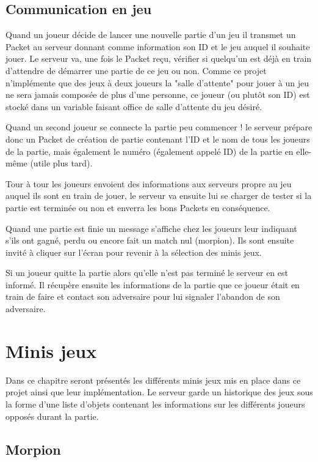 \documentclass{report}
\begin{document}
\section{Communication en jeu}

Quand un joueur décide de lancer une nouvelle partie d'un jeu il transmet un Packet au serveur donnant comme information son ID et le jeu
auquel il souhaite jouer. Le serveur va, une fois le Packet reçu, vérifier si quelqu'un est déjà en train d'attendre de démarrer une partie de ce jeu
ou non. Comme ce projet n'implémente que des jeux à deux joueurs la "salle d'attente" pour jouer à un jeu ne sera jamais composée de plus d'une personne,
ce joueur (ou plutôt son ID) est stocké dans un variable faisant office de salle d'attente du jeu désiré.

Quand un second joueur se connecte la partie peu commencer ! le serveur prépare donc un Packet de création de partie contenant l'ID et le nom de tous les
joueurs de la partie, mais également le numéro (également appelé ID) de la partie en elle-même (utile plus tard).

Tour à tour les joueurs envoient des informations aux serveurs propre au jeu auquel ils sont en train de jouer, le serveur va ensuite lui se charger de
tester si la partie est terminée ou non et enverra les bons Packets en conséquence.

Quand une partie est finie un message s'affiche chez les joueurs leur indiquant s'ils ont gagné, perdu ou encore fait un match nul (morpion). Ils sont
ensuite invité à cliquer sur l'écran pour revenir à la sélection des minis jeux.

Si un joueur quitte la partie alors qu'elle n'est pas terminé le serveur en est informé. Il récupère ensuite les informations de la partie que
ce joueur était en train de faire et contact son adversaire pour lui signaler l'abandon de son adversaire.

\chapter{Minis jeux}
Dans ce chapitre seront présentés les différents minis jeux mis en place dans
ce projet ainsi que leur implémentation.
Le serveur garde un historique des jeux sous la forme d'une liste d'objets
contenant les informations sur les différents joueurs opposés durant la partie.

\section{Morpion}
\label{Morpion}
\end{document}
